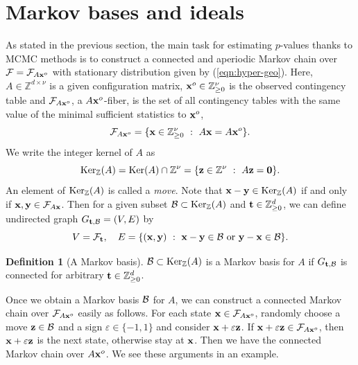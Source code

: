 \documentclass[12pt]{article}
\theoremstyle{definition}
\newtheorem{Definition}[Theorem]{Definition}
\def\Bt{{\bf t}}
\def\Bx{{\bf x}}
\def\By{{\bf y}}
\def\Bt{{\bf t}}
\def\Bz{{\bf z}}
\def\Bzero{{\bf 0}}
\begin{document}
\section{Markov bases and ideals}
As stated in the previous section, 
the main task for estimating $p$-values thanks to MCMC methods is to 
construct a connected and aperiodic Markov
chain over ${\cal F} = {\cal F}_{A\Bx^o}$ with stationary distribution
given by (\ref{eqn:hyper-geo}). 
Here, $A \in \mathbb{Z}^{d\times \nu}$ is
a given configuration matrix, $\Bx^o \in \mathbb{Z}_{\geq 0}^{\nu}$ is
the observed contingency table and ${\cal F}_{A\Bx^o}$, a
$A\Bx^o$-fiber,
 is the set of all
contingency tables with the same value of the minimal sufficient
statistics to $\Bx^o$,
\[
{\cal F}_{A\Bx^o} = \{\Bx \in \mathbb{Z}_{\geq 0}^{\nu}\ :\ A\Bx = A\Bx^o\}. 
\]
We write the integer kernel of $A$ as
\[
 {\rm Ker}_{\mathbb{Z}}(A) = {\rm Ker}(A) \cap \mathbb{Z}^{\nu}
= \{\Bz \in \mathbb{Z}^{\nu}\ :\ A\Bz = \Bzero\}.
\]
An element of $ {\rm Ker}_{\mathbb{Z}}(A)$ is called a {\it move}. 
Note that $\Bx - \By \in {\rm Ker}_{\mathbb{Z}}(A)$ if and only if $\Bx,
\By \in {\cal F}_{A\Bx}$.
Then for a given subset 
${\cal B} \subset {\rm Ker}_{\mathbb{Z}}(A)$ and 
$\Bt \in \mathbb{Z}_{\geq 0}^d$, 
we can define
      undirected graph $G_{\Bt, {\cal B}} = (V, E)$ by
\[
 V = {\cal F}_{\Bt},\ \ \ 
E = \{(\Bx, \By)\ :\ \Bx - \By \in {\cal B}\ \mbox{or}\  
\By - \Bx \in {\cal B}
\}.
\]
\begin{Definition}[A Markov basis]
${\cal B} \subset {\rm Ker}_{\mathbb{Z}}(A)$ is a Markov basis for $A$
      if $G_{\Bt, {\cal B}}$ is connected for arbitrary $\Bt \in
      \mathbb{Z}_{\geq 0}^{d}$. 
\end{Definition}
Once we obtain a Markov basis ${\cal B}$ for $A$, we can construct a
      connected Markov chain over ${\cal F}_{A\Bx^o}$ easily as
      follows. 
For each state $\Bx \in {\cal F}_{A\Bx^o}$,
randomly choose a move $\Bz \in {\cal B}$ and a sign $\varepsilon \in
	     \{-1,1\}$ 
and consider $\Bx + \varepsilon\Bz$. 
If $\Bx + \varepsilon\Bz \in {\cal F}_{A\Bx^o}$, then $\Bx
	     + \varepsilon\Bz$ is
	     the next state, otherwise stay at $\Bx$. Then we have the
	     connected Markov chain over $A\Bx^o$. 
We see these arguments in an example.
\end{document}
